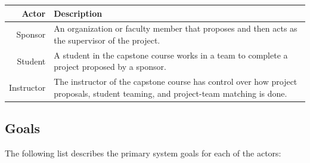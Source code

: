 \documentclass[12pt]{article}
\begin{document}
\begin{center}
\begin{tabularx}{\linewidth}{ |r|X| }
	\hline
	\textbf{Actor} & \textbf{Description} \\
	\hline\hline
	Sponsor & An organization or faculty member that proposes and then acts as the supervisor of the project. \\
	\hline
	Student & A student in the capstone course works in a team to complete a project proposed by a sponsor. \\
	\hline
	Instructor & The instructor of the capstone course has control over how project proposals, student teaming, and project-team matching is done. \\
	\hline
\end{tabularx}
\end{center}

\subsection{Goals}

The following list describes the primary system goals for each of the actors:
\end{document}
